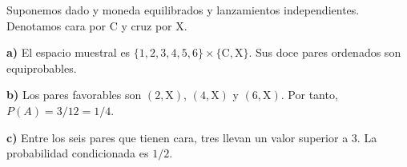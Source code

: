 Suponemos dado y moneda equilibrados y lanzamientos independientes. Denotamos cara por $\mathrm C$ y cruz por $\mathrm X$.

\textbf{a)} El espacio muestral es $\{1,2,3,4,5,6\}\times\{\mathrm C,\mathrm X\}$. Sus doce pares ordenados son equiprobables.

\textbf{b)} Los pares favorables son $(2,\mathrm X)$, $(4,\mathrm X)$ y $(6,\mathrm X)$. Por tanto, $P(A)=3/12=\boxed{1/4}$.

\textbf{c)} Entre los seis pares que tienen cara, tres llevan un valor superior a $3$. La probabilidad condicionada es $\boxed{1/2}$.
